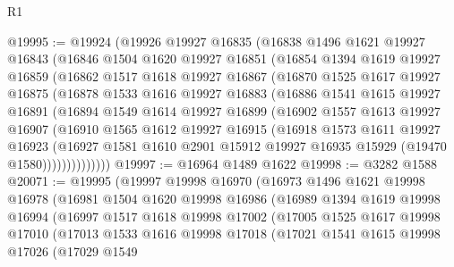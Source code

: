 \begin{lexlean}{R1}
\begin{coremodule}
@19995 := @19924
    (@19926
      @19927
      @16835
      (@16838
        @1496
        @1621
        @19927
        @16843
        (@16846
          @1504
          @1620
          @19927
          @16851
          (@16854
            @1394
            @1619
            @19927
            @16859
            (@16862
              @1517
              @1618
              @19927
              @16867
              (@16870
                @1525
                @1617
                @19927
                @16875
                (@16878
                  @1533
                  @1616
                  @19927
                  @16883
                  (@16886
                    @1541
                    @1615
                    @19927
                    @16891
                    (@16894
                      @1549
                      @1614
                      @19927
                      @16899
                      (@16902
                        @1557
                        @1613
                        @19927
                        @16907
                        (@16910
                          @1565
                          @1612
                          @19927
                          @16915
                          (@16918
                            @1573
                            @1611
                            @19927
                            @16923
                            (@16927
                              @1581
                              @1610
                              @2901
                              @15912
                              @19927
                              @16935
                              @15929
                              (@19470 @1580))))))))))))))
@19997 := @16964 @1489 @1622
@19998 := @3282 @1588
@20071 := @19995
    (@19997
      @19998
      @16970
      (@16973
        @1496
        @1621
        @19998
        @16978
        (@16981
          @1504
          @1620
          @19998
          @16986
          (@16989
            @1394
            @1619
            @19998
            @16994
            (@16997
              @1517
              @1618
              @19998
              @17002
              (@17005
                @1525
                @1617
                @19998
                @17010
                (@17013
                  @1533
                  @1616
                  @19998
                  @17018
                  (@17021
                    @1541
                    @1615
                    @19998
                    @17026
                    (@17029
                      @1549

\end{coremodule}
\end{lexlean}
